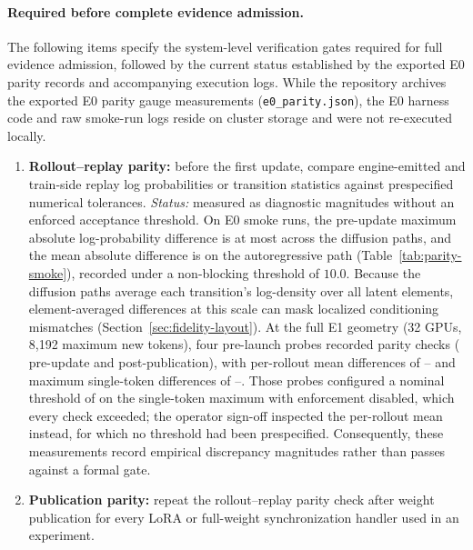 \documentclass[10pt]{article}
\newcommand{\codepath}[1]{\texttt{#1}}
\begin{document}
\paragraph{Required before complete evidence admission.}
The following items specify the system-level verification gates required for full evidence admission, followed by the current status established by the exported E0 parity records and accompanying execution logs.
While the repository archives the exported E0 parity gauge measurements (\codepath{e0\_parity.json}), the E0 harness code and raw smoke-run logs reside on cluster storage and were not re-executed locally.
\begin{enumerate}
  \item \textbf{Rollout--replay parity:} before the first update, compare engine-emitted and train-side replay log probabilities or transition statistics against prespecified numerical tolerances.
  \emph{Status:} measured as diagnostic magnitudes without an enforced acceptance threshold. On E0 smoke runs, the pre-update maximum absolute log-probability difference is at most \EZeroDiffusionBeforeLargest{} across the diffusion paths, and the mean absolute difference is \EZeroARBeforeMean{} on the autoregressive path (Table~\ref{tab:parity-smoke}), recorded under a non-blocking threshold of $10.0$. Because the diffusion paths average each transition's log-density over all latent elements, element-averaged differences at this scale can mask localized conditioning mismatches (Section~\ref{sec:fidelity-layout}). At the full E1 geometry (32 GPUs, 8,192 maximum new tokens), four pre-launch probes recorded \EOneGateChecks{} parity checks (\EOneGateBefore{} pre-update and \EOneGateAfter{} post-publication), with per-rollout mean differences of \EOneGateMeanMin{}--\EOneGateMeanMax{} and maximum single-token differences of \EOneGateTokenMin{}--\EOneGateTokenMax{}. Those probes configured a nominal threshold of \EOneGateTolerance{} on the single-token maximum with enforcement disabled, which every check exceeded; the operator sign-off inspected the per-rollout mean instead, for which no threshold had been prespecified. Consequently, these measurements record empirical discrepancy magnitudes rather than passes against a formal gate.
  \item \textbf{Publication parity:} repeat the rollout--replay parity check after weight publication for every LoRA or full-weight synchronization handler used in an experiment.

\end{enumerate}
\end{document}
